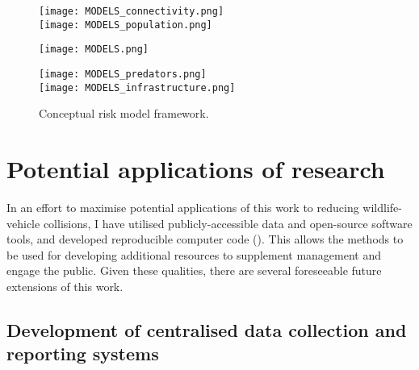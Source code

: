 \begin{figure*}[htp]
  \centering
  	\begin{minipage}[t][][b]{.13\textwidth}
    	\centering
    	\texttt{[image: MODELS\_connectivity.png]}\\
    	\texttt{[image: MODELS\_population.png]}   	
    \end{minipage}
    \hspace{.05\textwidth}
  	\begin{minipage}{.38\textwidth}
    	\centering
    	\texttt{[image: MODELS.png]}
    \end{minipage}
    \hspace{.05\textwidth}
  	\begin{minipage}[t][][b]{.13\textwidth}
    	\centering
    	\texttt{[image: MODELS\_predators.png]}\\
    	\texttt{[image: MODELS\_infrastructure.png]}
    \end{minipage}    	   	   
  \caption[Conceptual risk model framework]{Conceptual risk model framework.}
  \label{gen_framework}
\end{figure*}

\section{Potential applications of research}

In an effort to maximise potential applications of this work to reducing wildlife-vehicle collisions, I have utilised publicly-accessible data and open-source software tools, and developed reproducible computer code (). This allows the methods to be used for developing additional resources to supplement management and engage the public. Given these qualities, there are several foreseeable future extensions of this work. 

\subsection{Development of centralised data collection and reporting systems}

